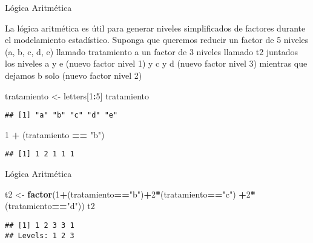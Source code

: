 \documentclass[ignorenonframetext,]{beamer}
\newenvironment{Shaded}{\begin{snugshade}}{\end{snugshade}}
\newcommand{\KeywordTok}[1]{\textcolor[rgb]{0.13,0.29,0.53}{\textbf{#1}}}
\newcommand{\DecValTok}[1]{\textcolor[rgb]{0.00,0.00,0.81}{#1}}
\newcommand{\StringTok}[1]{\textcolor[rgb]{0.31,0.60,0.02}{#1}}
\newcommand{\OperatorTok}[1]{\textcolor[rgb]{0.81,0.36,0.00}{\textbf{#1}}}
\newcommand{\NormalTok}[1]{#1}
\begin{document}
\begin{frame}[fragile]{Lógica Aritmética}

La lógica aritmética es útil para generar niveles simplificados de
factores durante el modelamiento estadístico. Suponga que queremos
reducir un factor de 5 niveles (a, b, c, d, e) llamado tratamiento a un
factor de 3 niveles llamado t2 juntados los niveles a y e (nuevo factor
nivel 1) y c y d (nuevo factor nivel 3) mientras que dejamos b solo
(nuevo factor nivel 2)

\begin{Shaded}
\begin{Highlighting}[]
\NormalTok{tratamiento <-}\StringTok{ }\NormalTok{letters[}\DecValTok{1}\OperatorTok{:}\DecValTok{5}\NormalTok{]}
\NormalTok{tratamiento}
\end{Highlighting}
\end{Shaded}

\begin{verbatim}
## [1] "a" "b" "c" "d" "e"
\end{verbatim}

\begin{Shaded}
\begin{Highlighting}[]
\DecValTok{1} \OperatorTok{+}\StringTok{ }\NormalTok{(tratamiento }\OperatorTok{==}\StringTok{ "b"}\NormalTok{)}
\end{Highlighting}
\end{Shaded}

\begin{verbatim}
## [1] 1 2 1 1 1
\end{verbatim}

\end{frame}

\begin{frame}[fragile]{Lógica Aritmética}

\begin{Shaded}
\begin{Highlighting}[]
\NormalTok{t2 <-}\StringTok{ }\KeywordTok{factor}\NormalTok{(}\DecValTok{1}\OperatorTok{+}\NormalTok{(tratamiento}\OperatorTok{==}\StringTok{"b"}\NormalTok{)}\OperatorTok{+}\DecValTok{2}\OperatorTok{*}\NormalTok{(tratamiento}\OperatorTok{==}\StringTok{"c"}\NormalTok{)}
             \OperatorTok{+}\DecValTok{2}\OperatorTok{*}\NormalTok{(tratamiento}\OperatorTok{==}\StringTok{"d"}\NormalTok{))}
\NormalTok{t2}
\end{Highlighting}
\end{Shaded}

\begin{verbatim}
## [1] 1 2 3 3 1
## Levels: 1 2 3
\end{verbatim}

\end{frame}
\end{document}
